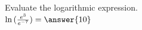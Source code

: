 \documentclass{ximera}
\author{David Kish}
\begin{document}
\begin{exercise}
Evaluate the logarithmic expression.\\
$ \ln{(\frac{e^{3}}{e^{-7}})} = \answer{10}$
\end{exercise}
\end{document}
